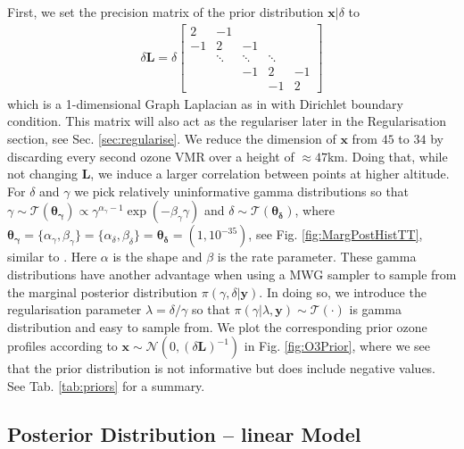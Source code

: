 First, we set the precision matrix of the prior distribution $\bm{x}|\delta$ to
\begin{align}
	\delta \bm{L} =
	\delta
	\begin{bmatrix}
		2 & -1 & & &  \\
		-1 & 2 & -1 & &   \\
		& \ddots & \ddots & \ddots &\\ 
		& & -1 & 2 & -1  \\
		& & & -1 & 2 
	\end{bmatrix} 
	\label{eq:GLapl} 
\end{align}
which is a 1-dimensional Graph Laplacian as in \cite{wang2015graphs,fox2016fast} with Dirichlet boundary condition.
This matrix will also act as the regulariser later in the Regularisation section, see Sec. \ref{sec:regularise}.
We reduce the dimension of $\bm{x}$ from $45$ to $34$ by discarding every second ozone VMR over a height of $\approx47$km.
Doing that, while not changing $\bm{L}$, we induce a larger correlation between points at higher altitude.
For $\delta$ and $\gamma$ we pick  relatively uninformative gamma distributions so that $\gamma \sim \mathcal{T}(\bm{\theta_{\gamma}}) \propto \gamma^{\alpha_\gamma -1 } \exp{( -\beta_\gamma \gamma) } $ and $\delta \sim \mathcal{T}(\bm{\theta_{\delta}})$, where $\bm{\theta_{\gamma}} = \{  \alpha_\gamma, \beta_\gamma\}  = \{ \alpha_\delta ,\beta_\delta\} = \bm{\theta_{\delta}} = (1,10^{-35})$, see Fig. \ref{fig:MargPostHistTT}, similar to \cite{fox2016fast}.
Here $ \alpha$ is the shape and $\beta$ is the rate parameter.
These gamma distributions have another advantage when using a MWG sampler to sample from the marginal posterior distribution $\pi(\gamma,\delta | \bm{y})$.
In doing so, we introduce the regularisation parameter $\lambda = \delta / \gamma $ so that $\pi(\gamma | \lambda, \bm{y}) \sim \mathcal{T}(\cdot)$ is gamma distribution and easy to sample from.
We plot the corresponding prior ozone profiles according to $\bm{x}\sim \mathcal{N}(0, (\delta \bm{L})^{-1})$ in Fig. \ref{fig:O3Prior}, where we see that the prior distribution is not informative but does include negative values.
See Tab. \ref{tab:priors} for a summary. 


\subsection{Posterior Distribution -- linear Model}
\label{sec:FirstO3Post}

